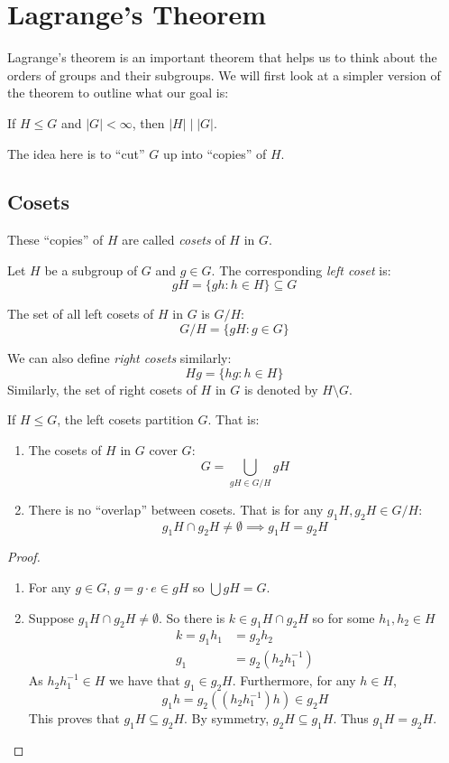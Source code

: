 \documentclass[../main.tex]{subfiles}
\begin{document}
\chapter{Lagrange's Theorem}
Lagrange's theorem is an important theorem that helps us to think about the orders of groups and their subgroups.
We will first look at a simpler version of the theorem to outline what our goal is:
\begin{theorem}
  If $H \leq G$  and $|G| < \infty$, then $|H| \mid |G|$.
\end{theorem}
The idea here is to ``cut'' $G$ up into ``copies'' of $H$.
\section{Cosets}
These ``copies'' of $H$ are called \textit{cosets} of $H$ in $G$.
\begin{definition}
  Let $H$ be a subgroup of $G$ and $g \in G$.
  The corresponding \textit{left coset} is:
  \[
    gH = \{gh : h \in H\} \subseteq G
  \]
\end{definition}
\begin{remark}[Notation]
  The set of all left cosets of $H$ in $G$ is $G / H$:
  \[
    G / H = \{gH : g \in G\}
  \]
\end{remark}
\begin{remark}
  We can also define \textit{right cosets} similarly:
  \[
    Hg = \{hg : h \in H\}
  \]
  Similarly, the set of right cosets of $H$ in $G$ is denoted by $H \setminus G$.
\end{remark}
\begin{lemma}
  If $H \leq G$, the left cosets partition $G$.
  That is:
  \begin{enumerate}
    \label{cosetsCover}
    \item The cosets of $H$ in $G$ cover $G$:
      \[
        G = \bigcup_{gH \in G / H} gH
      \]
    \item There is no ``overlap'' between cosets.
      That is for any $g_1H, g_2H \in G / H$:
      \[
        g_1H \cap g_2H \neq \emptyset \implies g_1H = g_2H
      \]
  \end{enumerate}
\end{lemma}
\begin{proof}
  \begin{enumerate}
    \item For any $g \in G$, $g = g \cdot e \in gH$ so $\bigcup gH = G$.
    \item Suppose $g_1H \cap g_2H \neq \emptyset$.
      So there is $k \in g_1H \cap g_2H$ so for some $h_1, h_2 \in H$
      \begin{align*}
        k = g_1 h_1 &= g_2 h_2 \\
        g_1 &= g_2 (h_2 h^{-1}_{1})
      \end{align*}
      As $h_2 h^{-1}_{1} \in H$ we have that $g_1 \in g_2 H$.
      Furthermore, for any $h \in H$,
      \[
        g_1 h = g_2 ((h_2 h^{-1}_{1}) h) \in g_2 H
      \]
      This proves that $g_1H \subseteq g_2H$.
      By symmetry, $g_2 H \subseteq g_1 H$.
      Thus $g_1H = g_2H$.
  \end{enumerate}
\end{proof}
\end{document}
